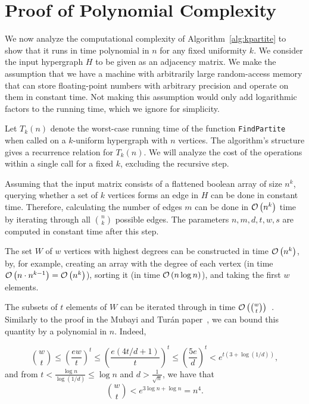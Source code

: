 \section{Proof of Polynomial Complexity}\label{sec:complexity} %

We now analyze the computational complexity of Algorithm~\ref{alg:kpartite} to show that it runs in time polynomial in $n$ for any fixed uniformity $k$.
We consider the input hypergraph $H$ to be given as an adjacency matrix.
We make the assumption that we have a machine with arbitrarily large random-access memory that can store
floating-point numbers with arbitrary precision and operate on them in constant time.
Not making this assumption would only add logarithmic factors to the running time, which we ignore for simplicity.

Let $T_k(n)$ denote the worst-case running time of the function \texttt{FindPartite} when called on a $k$-uniform hypergraph with $n$ vertices.
The algorithm's structure gives a recurrence relation for $T_k(n)$.
We will analyze the cost of the operations within a single call for a fixed $k$, excluding the recursive step.

Assuming that the input matrix consists of a flattened boolean array of size $n^k$,
querying whether a set of $k$ vertices forms an edge in $H$ can be done in constant time.
Therefore, calculating the number of edges $m$ can be done in $\mathcal{O}\left(n^k\right)$ time by iterating through all $\binom{n}{k}$ possible edges.
The parameters $n, m, d, t, w, s$ are computed in constant time after this step.

The set $W$ of $w$ vertices with highest degrees can be constructed in time $\mathcal{O}\left(n^k\right)$, by, for example,
creating an array with the degree of each vertex (in time  $\mathcal{O}\left(n \cdot n^{k-1}\right) = \mathcal{O}\left(n^k\right)$), sorting it (in time $\mathcal{O}\left(n \log n\right)$),
and taking the first $w$ elements.

The subsets of $t$ elements of $W$ can be iterated through in time $\mathcal{O}\left(\binom{w}{t}\right)$~\cite{reingold1977combinatorial}.
Similarly to the proof in the Mubayi and Tur\'{a}n paper~\cite{MUBAYI2010174}, we can bound this quantity by a polynomial in $n$.
Indeed,

\[
    \binom{w}{t} \leq \left(\frac{ew}{t}\right)^t \leq \left(\frac{e(4t/d + 1)}{t}\right)^t \leq \left(\frac{5e}{d}\right)^t < e^{t(3 + \log (1/d))},
\]
and from $t  < \frac{\log n}{\log (1/d)} \leq \log n$ and $d > \frac{1}{\sqrt{n}}$, we have that
\[
    \binom{w}{t} < e^{3 \log n + \log n} = n^{4}.
\]

